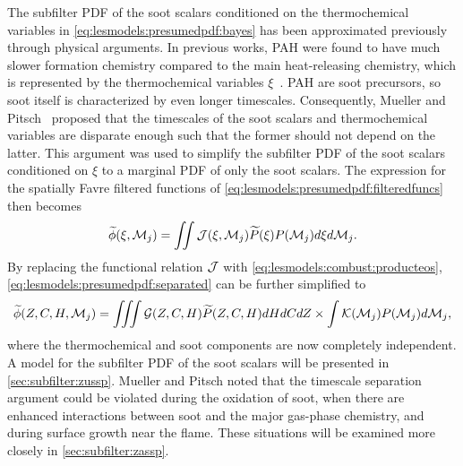 The subfilter PDF of the soot scalars conditioned on the thermochemical variables in \cref{eq:lesmodels:presumedpdf:bayes} has been approximated previously through physical arguments. In previous works, PAH were found to have much slower formation chemistry compared to the main heat-releasing chemistry, which is represented by the thermochemical variables $\xi$~\cite{attili2014,bisetti2012}. PAH are soot precursors, so soot itself is characterized by even longer timescales. Consequently, Mueller and Pitsch~\cite{subfilterpdf2011} proposed that the timescales of the soot scalars and thermochemical variables are disparate enough such that the former should not depend on the latter. This argument was used to simplify the subfilter PDF of the soot scalars conditioned on $\xi$ to a marginal PDF of only the soot scalars. The expression for the spatially Favre filtered functions of \cref{eq:lesmodels:presumedpdf:filteredfuncs} then becomes
\begin{equation}\label{eq:lesmodels:presumedpdf:separated}
  \widetilde{\phi}(\xi,\mathcal{M}_j) = \iint \mathcal{J}(\xi,\mathcal{M}_j)\widetilde{P}(\xi)P(\mathcal{M}_j) d\xi d\mathcal{M}_j.
\end{equation}
By replacing the functional relation $\mathcal{J}$ with \cref{eq:lesmodels:combust:producteos}, \cref{eq:lesmodels:presumedpdf:separated} can be further simplified to
\begin{equation}\label{eq:lesmodels:presumedpdf:indep}
  \widetilde{\phi}(Z,C,H,\mathcal{M}_j) = \iiint \mathcal{G}(Z,C,H)\widetilde{P}(Z,C,H) dHdCdZ \times \int \mathcal{K}(\mathcal{M}_j)P(\mathcal{M}_j) d\mathcal{M}_j,
\end{equation}
where the thermochemical and soot components are now completely independent. A model for the subfilter PDF of the soot scalars will be presented in \cref{sec:subfilter:zussp}. Mueller and Pitsch noted that the timescale separation argument could be violated during the oxidation of soot, when there are enhanced interactions between soot and the major gas-phase chemistry, and during surface growth near the flame. These situations will be examined more closely in \cref{sec:subfilter:zassp}.

